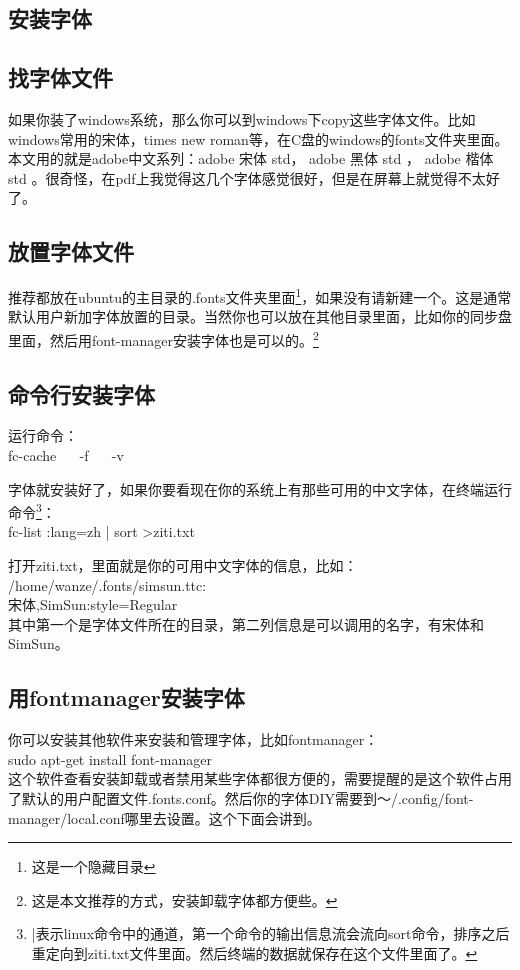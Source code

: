 \documentclass[12pt,oneside]{book}
\begin{document}
\begin{common-format}
\section{安装字体}
\label{sec:安装字体} 
\subsection{找字体文件}
如果你装了windows系统，那么你可以到windows下copy这些字体文件。比如windows常用的宋体，times new roman等，在C盘的windows的fonts文件夹里面。本文用的就是adobe中文系列：adobe 宋体 std， adobe 黑体 std ， adobe 楷体 std 。很奇怪，在pdf上我觉得这几个字体感觉很好，但是在屏幕上就觉得不太好了。

\subsection{放置字体文件}
推荐都放在ubuntu的主目录的.fonts文件夹里面\footnote{这是一个隐藏目录}，如果没有请新建一个。这是通常默认用户新加字体放置的目录。当然你也可以放在其他目录里面，比如你的同步盘里面，然后用font-manager安装字体也是可以的。\footnote{这是本文推荐的方式，安装卸载字体都方便些。}

\subsection{命令行安装字体}
运行命令：\\
fc-cache ~~ -f ~~ -v  

字体就安装好了，如果你要看现在你的系统上有那些可用的中文字体，在终端运行命令\footnote{|表示linux命令中的通道，第一个命令的输出信息流会流向sort命令，排序之后重定向到ziti.txt文件里面。然后终端的数据就保存在这个文件里面了。}：\\
fc-list :lang=zh | sort >ziti.txt 

打开ziti.txt，里面就是你的可用中文字体的信息，比如：\\
/home/wanze/.fonts/simsun.ttc: \\宋体,SimSun:style=Regular \\
其中第一个是字体文件所在的目录，第二列信息是可以调用的名字，有宋体和SimSun。

\subsection{用fontmanager安装字体}
你可以安装其他软件来安装和管理字体，比如fontmanager：\\
sudo  apt-get install font-manager  \\
这个软件查看安装卸载或者禁用某些字体都很方便的，需要提醒的是这个软件占用了默认的用户配置文件.fonts.conf。然后你的字体DIY需要到～/.config/font-manager/local.conf哪里去设置。这个下面会讲到。




\end{common-format}
\end{document}
